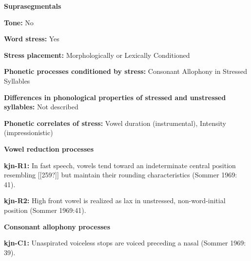 \begin{styleBody}
\textbf{Suprasegmentals}
\end{styleBody}

\begin{styleBody}
\textbf{Tone:} No
\end{styleBody}

\begin{styleBody}
\textbf{Word stress:} Yes
\end{styleBody}

\begin{styleBody}
\textbf{Stress placement:} Morphologically or Lexically Conditioned
\end{styleBody}

\begin{styleBody}
\textbf{Phonetic processes conditioned by stress:} Consonant Allophony in Stressed Syllables
\end{styleBody}

\begin{styleBody}
\textbf{Differences in phonological properties of stressed and unstressed syllables:} Not described
\end{styleBody}

\begin{styleBody}
\textbf{Phonetic correlates of stress: }Vowel duration (instrumental), Intensity (impressionistic)
\end{styleBody}

\begin{styleBody}
\textbf{Vowel reduction processes}
\end{styleBody}

\begin{styleBody}
\textbf{kjn-R1:} In fast speech, vowels tend toward an indeterminate central position resembling [[259?]] but maintain their rounding characteristics (Sommer 1969: 41).
\end{styleBody}

\begin{styleBody}
\textbf{kjn-R2:} High front vowel is realized as lax in unstressed, non-word-initial position (Sommer 1969:41).
\end{styleBody}

\begin{styleBody}
\textbf{Consonant allophony processes}
\end{styleBody}

\begin{styleBody}
\textbf{kjn-C1: }Unaspirated voiceless stops are voiced preceding a nasal (Sommer 1969: 39).
\end{styleBody}

